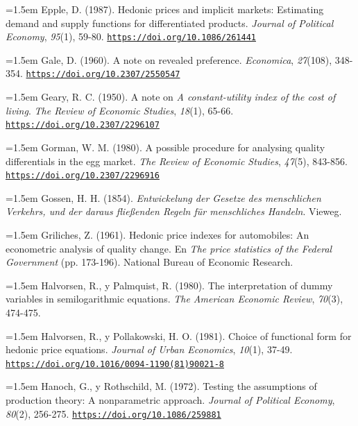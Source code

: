 \documentclass[10pt,a4paper]{article}
\begin{document}
{\sloppy\noindent\hangindent=1.5em Epple, D. (1987). Hedonic prices and implicit markets: Estimating demand and supply functions for differentiated products. \textit{Journal of Political Economy}, \textit{95}(1), 59-80. \href{https://doi.org/10.1086/261441}{\nolinkurl{https://doi.org/10.1086/261441}}\par}

\noindent\hangindent=1.5em Gale, D. (1960). A note on revealed preference. \textit{Economica}, \textit{27}(108), 348-354. \href{https://doi.org/10.2307/2550547}{\nolinkurl{https://doi.org/10.2307/2550547}}

\noindent\hangindent=1.5em Geary, R. C. (1950). A note on \textit{A constant-utility index of the cost of living}. \textit{The Review of Economic Studies}, \textit{18}(1), 65-66. \href{https://doi.org/10.2307/2296107}{\nolinkurl{https://doi.org/10.2307/2296107}}

\noindent\hangindent=1.5em Gorman, W. M. (1980). A possible procedure for analysing quality differentials in the egg market. \textit{The Review of Economic Studies}, \textit{47}(5), 843-856. \href{https://doi.org/10.2307/2296916}{\nolinkurl{https://doi.org/10.2307/2296916}}

\noindent\hangindent=1.5em Gossen, H. H. (1854). \textit{Entwickelung der Gesetze des menschlichen Verkehrs, und der daraus fließenden Regeln für menschliches Handeln}. Vieweg.

\noindent\hangindent=1.5em Griliches, Z. (1961). Hedonic price indexes for automobiles: An econometric analysis of quality change. En \textit{The price statistics of the Federal Government} (pp. 173-196). National Bureau of Economic Research.

\noindent\hangindent=1.5em Halvorsen, R., y Palmquist, R. (1980). The interpretation of dummy variables in semilogarithmic equations. \textit{The American Economic Review}, \textit{70}(3), 474-475.

{\sloppy\noindent\hangindent=1.5em Halvorsen, R., y Pollakowski, H. O. (1981). Choice of functional form for hedonic price equations. \textit{Journal of Urban Economics}, \textit{10}(1), 37-49. \href{https://doi.org/10.1016/0094-1190(81)90021-8}{\nolinkurl{https://doi.org/10.1016/0094-1190(81)90021-8}}\par}

\noindent\hangindent=1.5em Hanoch, G., y Rothschild, M. (1972). Testing the assumptions of production theory: A nonparametric approach. \textit{Journal of Political Economy}, \textit{80}(2), 256-275. \href{https://doi.org/10.1086/259881}{\nolinkurl{https://doi.org/10.1086/259881}}
\end{document}
